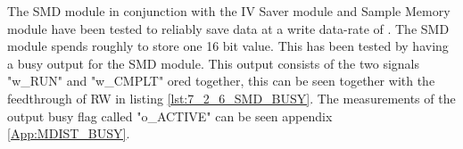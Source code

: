 The SMD module in conjunction with the IV Saver module and Sample Memory module have been tested to reliably save data at a write data-rate of . The SMD module spends roughly  to store one 16 bit value. This has been tested by having a busy output for the SMD module. This output consists of the two signals "w\_RUN" and "w\_CMPLT" ored together, this can be seen together with the feedthrough of RW in listing \ref{lst:7_2_6_SMD_BUSY}. The measurements of the output busy flag called "o\_ACTIVE" can be seen appendix \ref{App:MDIST_BUSY}.

 